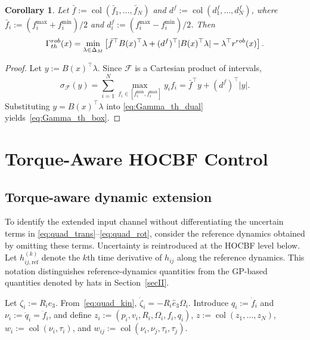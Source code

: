 \documentclass[10pt,a4paper]{amsart}
\newtheorem{corollary}[theorem]{Corollary}
\begin{document}
\begin{corollary}
Let $\bar f:=\operatorname{col}(\bar f_1,\ldots,\bar f_N)$ and
$d^f:=\operatorname{col}(d_1^f,\ldots,d_N^f)$, where
$\bar f_i:=(f_i^{\max}+f_i^{\min})/2$ and
$d_i^f:=(f_i^{\max}-f_i^{\min})/2$. Then
\begin{equation}
    \Gamma_{\rm th}^{\rm rob}(x)
    =
    \min_{\lambda\in\Delta_M}
    \left[
        \bar f^\top B(x)^\top\lambda
        +
        (d^f)^\top|B(x)^\top\lambda|
        -
        \lambda^\top r^{\rm rob}(x)
    \right].
    \label{eq:Gamma_th_box}
\end{equation}
\end{corollary}

\begin{proof}
Let $y:=B(x)^\top\lambda$. Since $\mathcal F$ is a Cartesian
product of intervals,
\[
    \sigma_{\mathcal F}(y)
    =
    \sum_{i=1}^N
    \max_{f_i\in[f_i^{\min},f_i^{\max}]}y_i f_i
    =
    \bar f^\top y+(d^f)^\top|y|.
\]
Substituting $y=B(x)^\top\lambda$ into
\eqref{eq:Gamma_th_dual} yields~\eqref{eq:Gamma_th_box}.
\end{proof}




\section{Torque-Aware HOCBF Control}
\label{sec:singularity_free}


\subsection{Torque-aware dynamic extension}\label{secIIIB}

To identify the extended input channel without differentiating
the uncertain terms in
\eqref{eq:quad_trans}--\eqref{eq:quad_rot},
consider the reference dynamics obtained by omitting these
terms. Uncertainty is reintroduced at the HOCBF level below.
Let $h_{ij,\mathrm{ref}}^{(k)}$ denote the $k$th time
derivative of $h_{ij}$ along the reference dynamics. This
notation distinguishes reference-dynamics quantities from the
GP-based quantities denoted by hats in Section~\ref{secII}.

Let $\zeta_i:=R_ie_3$. From~\eqref{eq:quad_kin},
$\dot\zeta_i=-R_i\widehat e_3\Omega_i$.
Introduce $q_i:=\dot f_i$ and
$\nu_i:=\dot q_i=\ddot f_i$, and define
$z_i:=(p_i,v_i,R_i,\Omega_i,f_i,q_i)$, $z:=\operatorname{col}(z_1,\ldots,z_N)$, $w_i:=\operatorname{col}(\nu_i,\tau_i)$, and
$w_{ij}:=\operatorname{col}(\nu_i,\nu_j,\tau_i,\tau_j)$.
\end{document}
